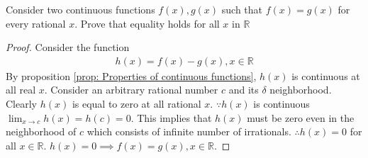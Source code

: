 \documentclass[journal,12pt,twocolumn]{IEEEtran}
\begin{document}
\begin{problem}
Consider two continuous functions $f(x),g(x)$ such that $f(x)=g(x)$ for every rational $x$. Prove that equality holds for all $x$ in $\mathbb{R}$ 
\end{problem}
\begin{proof}
Consider the function 
\begin{align}
h(x)=f(x)-g(x),x\in\mathbb{R}
\end{align} 
By proposition \ref{prop: Properties of continuous functions}, $h(x)$ is continuous at all real $x$.
Consider an arbitrary rational number $c$ and its $\delta$ neighborhood. Clearly $h(x)$ is equal to zero at all rational $x$.
$\because h(x)$ is continuous $\lim_{x \to c} h(x) = h(c) =0$. 
This implies that $h(x)$ must be zero even in the neighborhood of $c$ which consists of infinite number of irrationals. 
$\therefore h(x) = 0$ for all $x \in \mathbb{R}$.
$h(x) = 0\implies f(x)=g(x), x \in \mathbb{R}$.
\end{proof}
\end{document}
